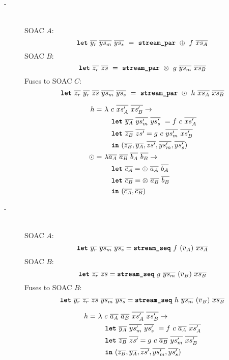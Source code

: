 \begin{description}
\item[-]\hfill\\

  SOAC $A$:
  \[
    \mbox{\texttt{\bfseries{let}}}~\overline{y_{r}}~\overline{ys_{m}}~\overline{ys_{s}}~=~\mbox{\texttt{\bfseries{stream\_par}}}~\oplus~f~\overline{xs_{A}}
  \]
  SOAC $B$:
  \[
    \mbox{\texttt{\bfseries{let}}}~\overline{z_{r}}~\overline{zs}~=~\mbox{\texttt{\bfseries{stream\_par}}}~\otimes~g~\overline{ys_{m}}~\overline{xs_{B}}
  \]
  Fuses to SOAC $C$:
  \[
    \mbox{\texttt{\bfseries{let}}}~\overline{z_{r}}~\overline{y_{r}}~\overline{zs}~\overline{ys_{m}}~\overline{ys_{s}}~=~\mbox{\texttt{\bfseries{stream\_par}}}~\odot~h~\overline{xs_{A}}~\overline{xs_{B}}
  \]

  \begin{align*}
    h =~& \lambda~c~\overline{xs'_{A}}~\overline{xs'_{B}} \rightarrow \\
        & \quad \mbox{\texttt{\bfseries{let}}}~\overline{y_{A}}~\overline{ys'_{m}}~\overline{ys'_{s}}~ = f~c~\overline{xs'_{A}} \\
        & \quad \mbox{\texttt{\bfseries{let}}}~\overline{z_{B}}~\overline{zs'} = g~c~\overline{ys'_{m}}~\overline{xs'_{B}} \\
        & \quad \mbox{\texttt{\bfseries{in}}}~(\overline{z_{B}},\overline{y_{A}},\overline{zs'},\overline{ys'_{m}},\overline{ys'_{s}}) \\
    \odot =~& \lambda \overline{a_{A}}~\overline{a_{B}}~\overline{b_{A}}~\overline{b_{B}} \rightarrow \\
        & \quad \mbox{\texttt{\bfseries{let}}}~\overline{c_{A}} = \oplus~\overline{a_{A}}~\overline{b_{A}} \\
        & \quad \mbox{\texttt{\bfseries{let}}}~\overline{c_{B}} = \otimes~\overline{a_{B}}~\overline{b_{B}} \\
        & \quad \mbox{\texttt{\bfseries{in}}}~(\overline{c_{A}}, \overline{c_{B}})
  \end{align*}

\item[-]\hfill\\

  SOAC $A$:
  \[
    \mbox{\texttt{\bfseries{let}}}~\overline{y_{r}}~\overline{ys_{m}}~\overline{ys_{s}} = \mbox{\texttt{\bfseries{stream\_seq}}}~f~(\overline{v}_{A})~\overline{xs_{A}}
  \]
  SOAC $B$:
  \[
    \mbox{\texttt{\bfseries{let}}}~\overline{z_{r}}~\overline{zs} = \mbox{\texttt{\bfseries{stream\_seq}}}~g~\overline{ys_{m}}~(\overline{v}_{B})~\overline{xs_{B}}
  \]
  Fuses to SOAC $B$:
  \[
    \mbox{\texttt{\bfseries{let}}}~\overline{y_{r}}~\overline{z_{r}}~\overline{zs}~\overline{ys_{m}}~\overline{ys_{s}} = \mbox{\texttt{\bfseries{stream\_seq}}}~h~\overline{ys_{m}}~(\overline{v}_{B})~\overline{xs_{B}}
  \]

  \begin{align*}
    h =~& \lambda~c~\overline{a_{A}}~\overline{a_{B}}~\overline{xs'_{A}}~\overline{xs'_{B}} \rightarrow \\
        & \quad \mbox{\texttt{\bfseries{let}}}~\overline{y_{A}}~\overline{ys'_{m}}~\overline{ys'_{s}}~ = f~c~\overline{a_{A}}~\overline{xs'_{A}} \\
        & \quad \mbox{\texttt{\bfseries{let}}}~\overline{z_{B}}~\overline{zs'} = g~c~\overline{a_{B}}~\overline{ys'_{m}}~\overline{xs'_{B}} \\
        & \quad \mbox{\texttt{\bfseries{in}}}~(\overline{z_{B}},\overline{y_{A}},\overline{zs'},\overline{ys'_{m}},\overline{ys'_{s}}) \\
  \end{align*}

\end{description}


